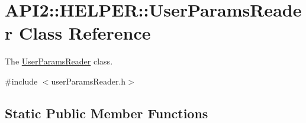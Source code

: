 \hypertarget{class_a_p_i2_1_1_h_e_l_p_e_r_1_1_user_params_reader}{\section{A\-P\-I2\-:\-:H\-E\-L\-P\-E\-R\-:\-:User\-Params\-Reader Class Reference}
\label{class_a_p_i2_1_1_h_e_l_p_e_r_1_1_user_params_reader}
}


The \hyperlink{class_a_p_i2_1_1_h_e_l_p_e_r_1_1_user_params_reader}{User\-Params\-Reader} class.  




{\ttfamily \#include $<$user\-Params\-Reader.\-h$>$}

\subsection*{Static Public Member Functions}
